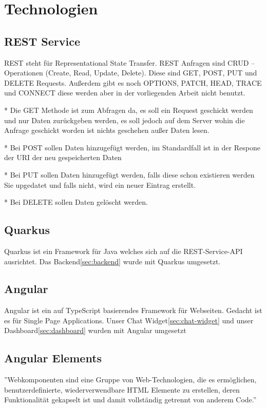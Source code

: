 \section{Technologien}

\subsection{REST Service}
REST steht für Representational State Transfer.
REST Anfragen sind CRUD – Operationen (Create, Read, Update, Delete).
Diese sind GET, POST, PUT und DELETE Requests.
Außerdem gibt es noch OPTIONS, PATCH, HEAD, TRACE
und CONNECT diese werden aber in der vorliegenden Arbeit nicht benutzt.

* Die GET Methode ist zum Abfragen da, es soll ein Request geschickt werden und nur Daten zurückgeben werden, es soll jedoch auf dem Server wohin die Anfrage geschickt worden ist nichts geschehen außer Daten lesen.

* Bei POST sollen Daten hinzugefügt werden, im Standardfall ist in der Respone der URI der neu gespeicherten Daten

* Bei PUT sollen Daten hinzugefügt werden, falls diese schon existieren werden Sie upgedatet und falls nicht, wird ein neuer Eintrag erstellt.

* Bei DELETE sollen Daten gelöscht werden.

\subsection{Quarkus}\label{quarkus}
Quarkus ist ein Framework für Java welches sich auf die REST-Service-API ausrichtet.
Das Backend\ref{sec:backend} wurde mit Quarkus umgesetzt.

\subsection{Angular}
Angular ist ein auf TypeScript basierendes Framework für Webseiten.
Gedacht ist es für Single Page Applications.
Unser Chat Widget\ref{sec:chat-widget} und unser Dashboard\ref{sec:dashboard} wurden mit Angular umgesetzt

\subsection{Angular Elements}\label{subsec:angular-elements}
''Webkomponenten sind eine Gruppe von Web-Technologien, die es ermöglichen, benutzerdefinierte, wiederverwendbare HTML Elemente zu erstellen, deren Funktionalität gekapselt ist und damit vollständig getrennt von anderem Code.''\cite{webcomponents}

